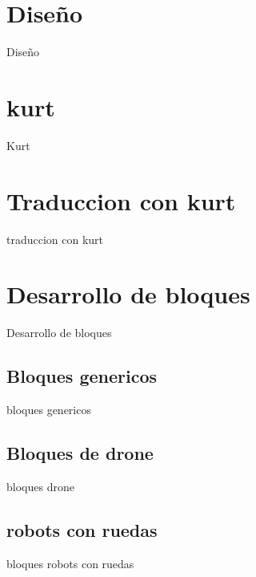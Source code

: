 \section{Diseño}
\label{sec:diseno}

Diseño

\section{kurt}
\label{sec:kurt}

Kurt

\section{Traduccion con kurt}
\label{sec:traduccion}

traduccion con kurt

\section{Desarrollo de bloques}
\label{sec:desarrollo-de-bloques}

Desarrollo de bloques

\subsection{Bloques genericos}
bloques genericos
\subsection{Bloques de drone}
bloques drone
\subsection{robots con ruedas}
bloques robots con ruedas
